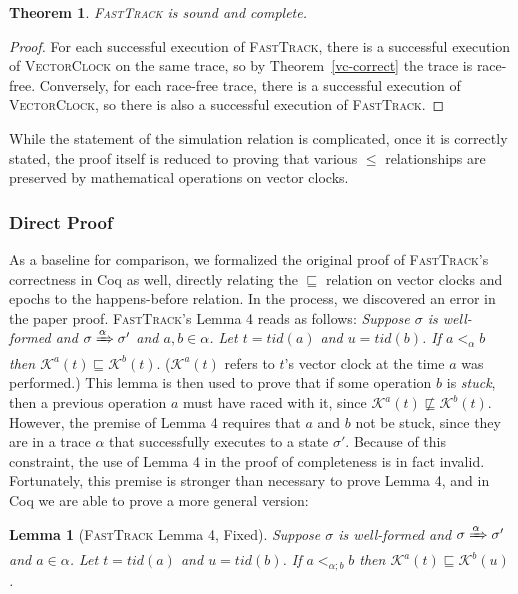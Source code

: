 \documentclass[preprint, 9pt]{sigplanconf}
\newcommand{\VCalg}{\textsc{VectorClock}\xspace}
\newcommand{\FT}{\textsc{FastTrack}\xspace}
\newtheorem{lemma}{Lemma}
\newtheorem{theorem}{Theorem}
\begin{document}
\begin{theorem}\FT is sound and complete.\end{theorem}
\begin{proof}For each successful execution of \FT, there is a successful execution of \VCalg on the same trace, so by Theorem~\ref{vc-correct} the trace is race-free. Conversely, for each race-free trace, there is a successful execution of \VCalg, so there is also a successful execution of \FT.\end{proof}

While the statement of the simulation relation is complicated, once it is correctly stated, the proof itself is reduced to proving that various $\le$ relationships are preserved by mathematical operations on vector clocks. %

\subsubsection{Direct Proof}
\label{bug}
As a baseline for comparison, we formalized the original proof of \FT's correctness in Coq as well, directly relating the $\sqsubseteq$ relation on vector clocks and epochs to the happens-before relation. In the process, we discovered an error in the paper proof. \FT's Lemma 4 reads as follows: {\it Suppose $\sigma$ is well-formed and $\sigma \xRightarrow{\alpha} \sigma'$ and $a, b \in \alpha$. Let $t = \mathit{tid}(a)$ and $u = \mathit{tid}(b)$. If $a <_{\alpha} b$ then $\mathcal{K}^a(t) \sqsubseteq \mathcal{K}^b(t).$} ($\mathcal{K}^a(t)$ refers to $t$'s vector clock at the time $a$ was performed.) This lemma is then used to prove that if some operation $b$ is \emph{stuck}, then a previous operation $a$ must have raced with it, since $\mathcal{K}^a(t) \not\sqsubseteq \mathcal{K}^b(t)$. However, the premise of Lemma 4 requires that $a$ and $b$ not be stuck, since they are in a trace $\alpha$ that successfully executes to a state $\sigma'$. Because of this constraint, the use of Lemma 4 in the proof of completeness is in fact invalid. Fortunately, this premise is stronger than necessary to prove Lemma 4, and in Coq we are able to prove a more general version:

\begin{lemma}[\FT Lemma 4, Fixed] Suppose $\sigma$ is well-formed and $\sigma
    \xRightarrow{\alpha} \sigma'$ and $a \in \alpha$. Let $t =
    \mathit{tid}(a)$ and $u = \mathit{tid}(b)$. If $a <_{\alpha; b} b$
    then $\mathcal{K}^a(t) \sqsubseteq \mathcal{K}^b(u)$.
\end{lemma}
\end{document}
